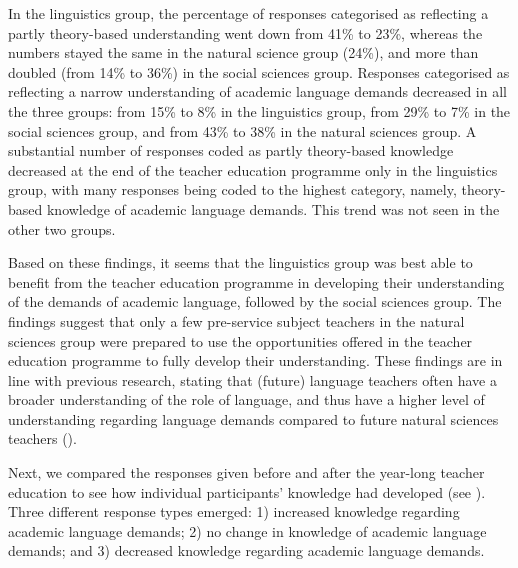 \documentclass[output=paper]{langscibook}
\begin{document}
In the linguistics group, the percentage of responses categorised as reflecting a partly theory-based understanding went down from 41\% to 23\%, whereas the numbers stayed the same in the natural science group (24\%), and more than doubled (from 14\% to 36\%) in the social sciences group. Responses categorised as reflecting a narrow understanding of academic language demands decreased in all the three groups: from 15\% to 8\% in the linguistics group, from 29\% to 7\% in the social sciences group, and from 43\% to 38\% in the natural sciences group. A substantial number of responses coded as partly theory-based knowledge decreased at the end of the teacher education programme only in the linguistics group, with many responses being coded to the highest category, namely, theory-based knowledge of academic language demands. This trend was not seen in the other two groups.

Based on these findings, it seems that the linguistics group was best able to benefit from the teacher education programme in developing their understanding of the demands of academic language, followed by the social sciences group. The findings suggest that only a few pre-service subject teachers in the natural sciences group were prepared to use the opportunities offered in the teacher education programme to fully develop their understanding. These findings are in line with previous research, stating that (future) language teachers often have a broader understanding of the role of language, and thus have a higher level of understanding regarding language demands compared to future natural sciences teachers (\citealt{AlisaariEtAl2019,HeikkolaEtAl2021}).

Next, we compared the responses given before and after the year-long teacher education to see how individual participants’ knowledge had developed (see ). Three different response types emerged: 1) increased knowledge regarding academic language demands; 2) no change in knowledge of academic language demands; and 3) decreased knowledge regarding academic language demands. 
\end{document}
